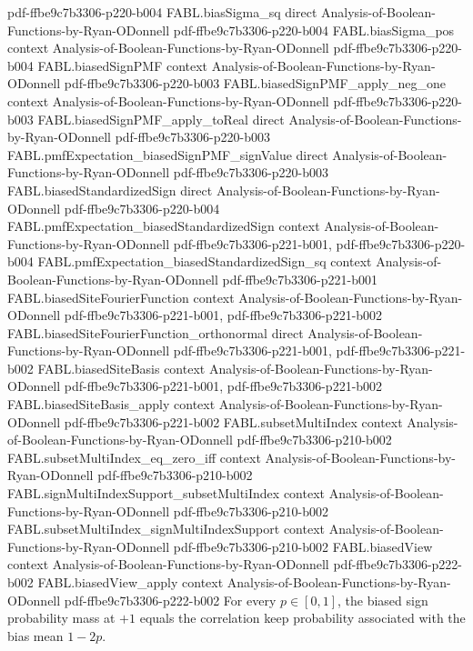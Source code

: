 \begin{theorem}
  {pdf-ffbe9c7b3306-p220-b004}
\proofstep
  {FABL.biasSigma_sq}
  {direct}
  {Analysis-of-Boolean-Functions-by-Ryan-ODonnell}
  {pdf-ffbe9c7b3306-p220-b004}
\proofstep
  {FABL.biasSigma_pos}
  {context}
  {Analysis-of-Boolean-Functions-by-Ryan-ODonnell}
  {pdf-ffbe9c7b3306-p220-b004}
\proofstep
  {FABL.biasedSignPMF}
  {context}
  {Analysis-of-Boolean-Functions-by-Ryan-ODonnell}
  {pdf-ffbe9c7b3306-p220-b003}
\proofstep
  {FABL.biasedSignPMF_apply_neg_one}
  {context}
  {Analysis-of-Boolean-Functions-by-Ryan-ODonnell}
  {pdf-ffbe9c7b3306-p220-b003}
\proofstep
  {FABL.biasedSignPMF_apply_toReal}
  {direct}
  {Analysis-of-Boolean-Functions-by-Ryan-ODonnell}
  {pdf-ffbe9c7b3306-p220-b003}
\proofstep
  {FABL.pmfExpectation_biasedSignPMF_signValue}
  {direct}
  {Analysis-of-Boolean-Functions-by-Ryan-ODonnell}
  {pdf-ffbe9c7b3306-p220-b003}
\proofstep
  {FABL.biasedStandardizedSign}
  {direct}
  {Analysis-of-Boolean-Functions-by-Ryan-ODonnell}
  {pdf-ffbe9c7b3306-p220-b004}
\proofstep
  {FABL.pmfExpectation_biasedStandardizedSign}
  {context}
  {Analysis-of-Boolean-Functions-by-Ryan-ODonnell}
  {pdf-ffbe9c7b3306-p221-b001,
    pdf-ffbe9c7b3306-p220-b004}
\proofstep
  {FABL.pmfExpectation_biasedStandardizedSign_sq}
  {context}
  {Analysis-of-Boolean-Functions-by-Ryan-ODonnell}
  {pdf-ffbe9c7b3306-p221-b001}
\proofstep
  {FABL.biasedSiteFourierFunction}
  {context}
  {Analysis-of-Boolean-Functions-by-Ryan-ODonnell}
  {pdf-ffbe9c7b3306-p221-b001,
    pdf-ffbe9c7b3306-p221-b002}
\proofstep
  {FABL.biasedSiteFourierFunction_orthonormal}
  {direct}
  {Analysis-of-Boolean-Functions-by-Ryan-ODonnell}
  {pdf-ffbe9c7b3306-p221-b001,
    pdf-ffbe9c7b3306-p221-b002}
\proofstep
  {FABL.biasedSiteBasis}
  {context}
  {Analysis-of-Boolean-Functions-by-Ryan-ODonnell}
  {pdf-ffbe9c7b3306-p221-b001,
    pdf-ffbe9c7b3306-p221-b002}
\proofstep
  {FABL.biasedSiteBasis_apply}
  {context}
  {Analysis-of-Boolean-Functions-by-Ryan-ODonnell}
  {pdf-ffbe9c7b3306-p221-b002}
\proofstep
  {FABL.subsetMultiIndex}
  {context}
  {Analysis-of-Boolean-Functions-by-Ryan-ODonnell}
  {pdf-ffbe9c7b3306-p210-b002}
\proofstep
  {FABL.subsetMultiIndex_eq_zero_iff}
  {context}
  {Analysis-of-Boolean-Functions-by-Ryan-ODonnell}
  {pdf-ffbe9c7b3306-p210-b002}
\proofstep
  {FABL.signMultiIndexSupport_subsetMultiIndex}
  {context}
  {Analysis-of-Boolean-Functions-by-Ryan-ODonnell}
  {pdf-ffbe9c7b3306-p210-b002}
\proofstep
  {FABL.subsetMultiIndex_signMultiIndexSupport}
  {context}
  {Analysis-of-Boolean-Functions-by-Ryan-ODonnell}
  {pdf-ffbe9c7b3306-p210-b002}
\proofstep
  {FABL.biasedView}
  {context}
  {Analysis-of-Boolean-Functions-by-Ryan-ODonnell}
  {pdf-ffbe9c7b3306-p222-b002}
\proofstep
  {FABL.biasedView_apply}
  {context}
  {Analysis-of-Boolean-Functions-by-Ryan-ODonnell}
  {pdf-ffbe9c7b3306-p222-b002}
For every $p\in[0,1]$, the biased sign probability mass at $+1$ equals the correlation
keep probability associated with the bias mean $1-2p$.
\end{theorem}

